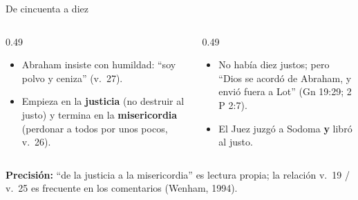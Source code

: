 \documentclass[hyperref={bookmarks=false},aspectratio=169]{beamer}
\newcommand{\destacar}[1]{\textbf{\textcolor{azul}{#1}}}
\newcommand{\precision}[1]{{\footnotesize\color{gris}\textbf{Precisión:} #1}}
\begin{document}
\begin{frame}{De cincuenta a diez}
\centering
{}\par\medskip
\begin{columns}[t,onlytextwidth]
\begin{column}{0.49\textwidth}\small
\begin{itemize}
\item Abraham insiste con humildad: ``soy polvo y ceniza'' (v.~27).
\item Empieza en la \destacar{justicia} (no destruir al justo) y termina en la \destacar{misericordia} (perdonar a todos por unos pocos, v.~26).
\end{itemize}
\end{column}
\begin{column}{0.49\textwidth}\small
\begin{itemize}
\item No había diez justos; pero ``Dios se acordó de Abraham, y envió fuera a Lot'' (Gn 19:29; 2 P 2:7).
\item El Juez juzgó a Sodoma \destacar{y} libró al justo.
\end{itemize}
\end{column}
\end{columns}\par\smallskip
\precision{``de la justicia a la misericordia'' es lectura propia; la relación v.~19 / v.~25 es frecuente en los comentarios (Wenham, 1994).}
\end{frame}
\end{document}
